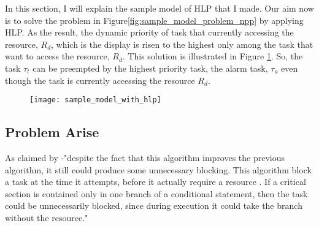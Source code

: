 In this section, I will explain the sample model of HLP that I made. Our aim now is to solve the problem in Figure\ref{fig:sample_model_problem_npp} by applying HLP. As the result, the dynamic priority of task that currently accessing the resource, $ R_{d}$, which is the display is risen to the highest only among the task that want to access the resource, $ R_{d}$. This solution is illustrated in Figure \ref{fig:sample_model_with_hlp}. So, the task $ \tau_{t}$ can be preempted by the highest priority task, the alarm task, $\tau_{a}$ even though the task is currently accessing the resource $ R_{d}$.


\begin{figure}[h]
    \centering
    \texttt{[image: sample\_model\_with\_hlp]}
    \caption{}
    \label{fig:sample_model_with_hlp}
\end{figure}


\subsection{Problem Arise}

As claimed by \cite{b5} -"despite the fact that this algorithm improves the previous algorithm, it still could produce some unnecessary blocking. This algorithm block a task at the time it attempts, before it actually require a resource \cite{b5}. If a critical section is contained only in one branch of a conditional statement, then the task could be unnecessarily blocked, since during execution it could take the branch without the resource."
 











